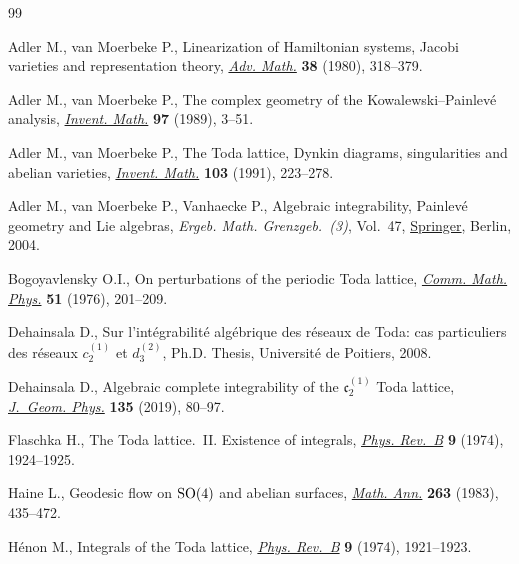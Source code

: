\begin{thebibliography}{99}
\footnotesize\itemsep=0pt


Adler M., van Moerbeke P., Linearization of {H}amiltonian systems, {J}acobi
 varieties and representation theory, \href{https://doi.org/10.1016/0001-8708(80)90008-0}{\textit{Adv. Math.}} \textbf{38} (1980),
 318--379.

Adler M., van Moerbeke P., The complex geometry of the
 {K}owalewski--{P}ainlev\'e analysis, \href{https://doi.org/10.1007/BF01850654}{\textit{Invent. Math.}} \textbf{97}
 (1989), 3--51.

Adler M., van Moerbeke P., The {T}oda lattice, {D}ynkin diagrams, singularities
 and abelian varieties, \href{https://doi.org/10.1007/BF01239513}{\textit{Invent. Math.}} \textbf{103} (1991), 223--278.

Adler M., van Moerbeke P., Vanhaecke P., Algebraic integrability, {P}ainlev\'e
 geometry and {L}ie algebras, \textit{Ergeb. Math. Grenzgeb.~(3)}, Vol.~47,
 \href{https://doi.org/10.1007/978-3-662-05650-9}{Springer}, Berlin, 2004.

Bogoyavlensky O.I., On perturbations of the periodic {T}oda lattice,
 \href{https://doi.org/10.1007/BF01617919}{\textit{Comm. Math. Phys.}} \textbf{51} (1976), 201--209.

Dehainsala D., Sur l'int\'egrabilit\'e alg\'ebrique des r\'eseaux de {T}oda:
 cas particuliers des r\'eseaux $c_2^{(1)}$ et $d_3^{(2)}$, Ph.D. Thesis,
 {U}niversit\'e de Poitiers, 2008.

Dehainsala D., Algebraic complete integrability of the {$\mathfrak c_2^{(1)}$}
 {T}oda lattice, \href{https://doi.org/10.1016/j.geomphys.2018.09.008}{\textit{J.~Geom. Phys.}} \textbf{135} (2019), 80--97.

Flaschka H., The {T}oda lattice.~{II}. {E}xistence of integrals, \href{https://doi.org/10.1103/PhysRevB.9.1924}{\textit{Phys.
 Rev.~B}} \textbf{9} (1974), 1924--1925.

Haine L., Geodesic flow on {${\rm SO}(4)$} and abelian surfaces, \href{https://doi.org/10.1007/BF01457053}{\textit{Math.
 Ann.}} \textbf{263} (1983), 435--472.

H\'enon M., Integrals of the {T}oda lattice, \href{https://doi.org/10.1103/PhysRevB.9.1921}{\textit{Phys. Rev.~B}} \textbf{9}
 (1974), 1921--1923.


\end{thebibliography}
